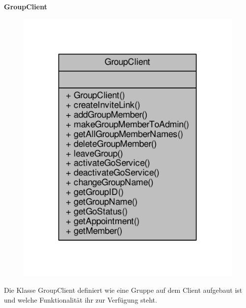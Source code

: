 \textbf{GroupClient}
\begin{figure}[H]
	\includegraphics[scale = 1]{res/umlClasses/group_client__coll__graph.pdf}
	\centering
\end{figure}
Die Klasse GroupClient definiert wie eine Gruppe auf dem Client aufgebaut ist und welche Funktionalität ihr zur Verfügung steht.
